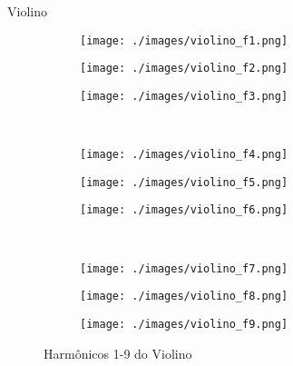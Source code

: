 \documentclass{beamer}
\begin{document}
\begin{frame}{Violino}
\vspace{-1 cm}
\begin{figure}
  \begin{subfigure}[b]{.15\linewidth}
    \caption*{}
    \texttt{[image: ./images/violino\_f1.png]}
  \end{subfigure}
  \hspace{2 cm}
  \begin{subfigure}[b]{.15\linewidth}
    \caption*{} 
    \texttt{[image: ./images/violino\_f2.png]}
  \end{subfigure}
\hspace{2 cm}
  \begin{subfigure}[b]{.15\linewidth}
    \caption*{} 
    \texttt{[image: ./images/violino\_f3.png]}
  \end{subfigure}  
  \\ \vspace{-0.5 cm}
  \begin{subfigure}[b]{.15\linewidth}
    \caption*{}
    \texttt{[image: ./images/violino\_f4.png]}
  \end{subfigure}
  \hspace{2 cm}
  \begin{subfigure}[b]{.15\linewidth}
    \caption*{} 
    \texttt{[image: ./images/violino\_f5.png]}
  \end{subfigure}
\hspace{2 cm}
  \begin{subfigure}[b]{.15\linewidth}
    \caption*{} 
    \texttt{[image: ./images/violino\_f6.png]}
  \end{subfigure}  
\\ \vspace{-0.5 cm}
  \begin{subfigure}[b]{.15\linewidth}
    \caption*{}
    \texttt{[image: ./images/violino\_f7.png]}
  \end{subfigure}
  \hspace{2 cm}
  \begin{subfigure}[b]{.15\linewidth}
    \caption*{} 
    \texttt{[image: ./images/violino\_f8.png]}
  \end{subfigure}
\hspace{2 cm}
  \begin{subfigure}[b]{.15\linewidth}
    \caption*{} 
    \texttt{[image: ./images/violino\_f9.png]}
  \end{subfigure}  
\caption{Harmônicos 1-9 do Violino}
\end{figure}
\end{frame}
\end{document}
